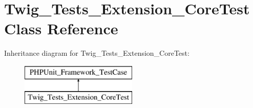 \hypertarget{classTwig__Tests__Extension__CoreTest}{}\section{Twig\+\_\+\+Tests\+\_\+\+Extension\+\_\+\+Core\+Test Class Reference}
\label{classTwig__Tests__Extension__CoreTest}
Inheritance diagram for Twig\+\_\+\+Tests\+\_\+\+Extension\+\_\+\+Core\+Test\+:\begin{figure}[H]
\begin{center}
\leavevmode
\includegraphics[height=2.000000cm]{classTwig__Tests__Extension__CoreTest}
\end{center}
\end{figure}
